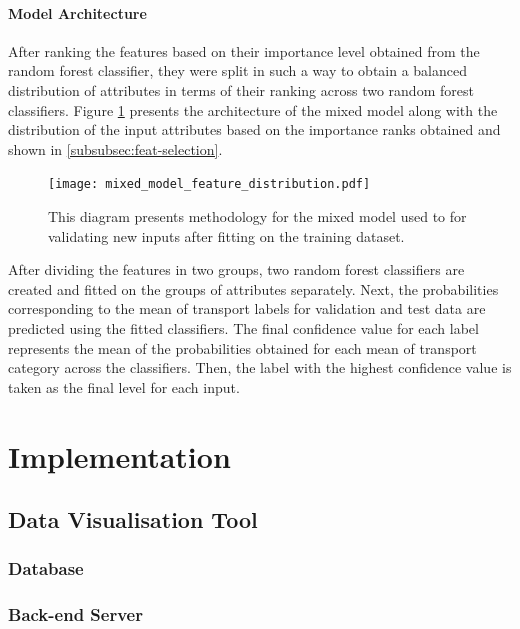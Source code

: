 \documentclass[bsc,frontabs,twoside,singlespacing,parskip,deptreport]{infthesis}     %
\begin{document}
\subsubsection{Model Architecture}

After ranking the features based on their importance level obtained from the random forest classifier, they were split in such a way to obtain a balanced distribution of attributes in terms of their ranking across two random forest classifiers. Figure \ref{fig:mixed_model_feature_distribution} presents the architecture of the mixed model along with the distribution of the input attributes based on the importance ranks obtained and shown in \ref{subsubsec:feat-selection}.

\begin{figure}[h]
  \center
  \texttt{[image: mixed\_model\_feature\_distribution.pdf]}
  \caption{This diagram presents methodology for the mixed model used to for validating new inputs after fitting on the training dataset.}
  \label{fig:mixed_model_feature_distribution}
\end{figure}

After dividing the features in two groups, two random forest classifiers are created and fitted on the groups of attributes separately. Next, the probabilities corresponding to the mean of transport labels for validation and test data are predicted using the fitted classifiers. The final confidence value for each label represents the mean of the probabilities obtained for each mean of transport category across the classifiers. Then, the label with the highest confidence value is taken as the final level for each input.


\chapter{Implementation}

\section{Data Visualisation Tool}
\label{sec:data-visualisation-tool}

\subsection{Database}

\subsection{Back-end Server}
\end{document}
